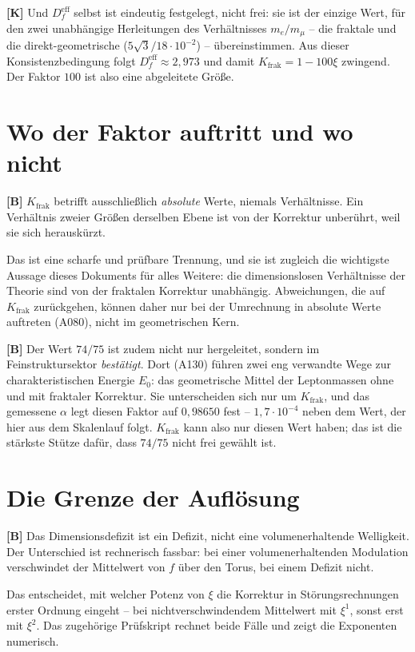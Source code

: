 \textbf{[K]} Und $D_f^\text{eff}$ selbst ist eindeutig festgelegt, nicht frei:
sie ist der einzige Wert, für den zwei unabhängige Herleitungen des Verhältnisses
$m_e/m_\mu$ -- die fraktale und die direkt-geometrische ($5\sqrt3/18\cdot10^{-2}$)
-- übereinstimmen. Aus dieser Konsistenzbedingung folgt $D_f^\text{eff}\approx
2{,}973$ und damit $K_\text{frak}=1-100\xi$ zwingend. Der Faktor $100$ ist also
eine abgeleitete Größe.

\section{Wo der Faktor auftritt und wo nicht}

\textbf{[B]} $K_\text{frak}$ betrifft ausschließlich \emph{absolute} Werte,
niemals Verhältnisse. Ein Verhältnis zweier Größen derselben Ebene ist von der
Korrektur unberührt, weil sie sich herauskürzt.

Das ist eine scharfe und prüfbare Trennung, und sie ist zugleich die wichtigste
Aussage dieses Dokuments für alles Weitere: die dimensionslosen Verhältnisse der
Theorie sind von der fraktalen Korrektur unabhängig. Abweichungen, die auf
$K_\text{frak}$ zurückgehen, können daher nur bei der Umrechnung in absolute
Werte auftreten (A080), nicht im geometrischen Kern.

\textbf{[B]} Der Wert $74/75$ ist zudem nicht nur hergeleitet, sondern
im Feinstruktursektor \emph{bestätigt}. Dort (A130) führen zwei eng verwandte
Wege zur charakteristischen Energie $E_0$: das geometrische Mittel der
Leptonmassen ohne und mit fraktaler Korrektur. Sie unterscheiden sich nur um
$K_\text{frak}$, und das gemessene $\alpha$ legt diesen Faktor auf
$0{,}98650$ fest -- $1{,}7\cdot10^{-4}$ neben dem Wert, der hier aus dem
Skalenlauf folgt. $K_\text{frak}$ kann also nur diesen Wert haben; das ist die
stärkste Stütze dafür, dass $74/75$ nicht frei gewählt ist.

\section{Die Grenze der Auflösung}

\textbf{[B]} Das Dimensionsdefizit ist ein Defizit, nicht eine
volumenerhaltende Welligkeit. Der Unterschied ist rechnerisch fassbar: bei einer
volumenerhaltenden Modulation verschwindet der Mittelwert von $f$ über den
Torus, bei einem Defizit nicht.

Das entscheidet, mit welcher Potenz von $\xi$ die Korrektur in
Störungsrechnungen erster Ordnung eingeht -- bei nichtverschwindendem Mittelwert
mit $\xi^1$, sonst erst mit $\xi^2$. Das zugehörige Prüfskript rechnet beide
Fälle und zeigt die Exponenten numerisch.


